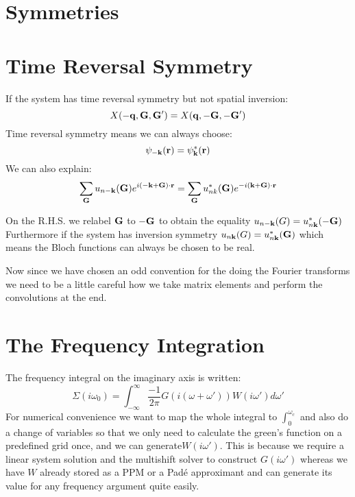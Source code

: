 \documentclass{article}
\def\r{{\bf r}}
\def\k{{\bf k}}
\def\q{{\bf q}}
\def\G{{\bf G}}
\begin{document}
\section{Symmetries}
\section{Time Reversal Symmetry}
If the system has time reversal symmetry but not spatial inversion:
%
\begin{equation}
X(-\q,\G,\G') = X(\q,-\G,-\G')
\end{equation}
%
Time reversal symmetry means we can always choose:
%
\begin{equation}
\psi_{-\k}(\r) = \psi^{*}_{\k}(\r)
\end{equation}
%
We can also explain:
%
\begin{equation}
\sum_{\G} u_{n-\k}(\G) e^{i(-\k+\G)\cdot\r} = \sum_{\G} u^{*}_{nk}(\G)e^{-i(\k+\G)\cdot\r}
\end{equation}

On the R.H.S. we relabel $\G$ to  $-\G$ to obtain the equality $u_{n-\k}(G)=u^{*}_{n\k}(-\G)$
Furthermore if the system has inversion symmetry $u_{n\k}(G)=u^{*}_{n\k}(\G)$ which means
the Bloch functions can always be chosen to be real.

Now since we have chosen an odd convention for the doing the Fourier 
transforms we need to be a little careful how we take matrix elements 
and perform the convolutions at the end. 

\section{The Frequency Integration}
The frequency integral on the imaginary axis is written:
%
\begin{equation}
\Sigma(i\omega_{0}) = \int_{-\infty}^{\infty}\frac{-1}{2\pi}G(i(\omega + \omega'))W(i\omega') d\omega'
\end{equation}
%
For numerical convenience we want to map the whole integral to $\int_{0}^{\omega_{c}}$ and also do
a change of variables so that we only need to calculate the green's function on a predefined grid once,
and we can generate$ W(i\omega')$. This is because we require a linear system solution and the multishift
solver to construct $G(i\omega')$ whereas we have $W$ already stored as a PPM or a Pad\'e approximant and can
generate its value for any frequency argument quite easily.  
\end{document}

